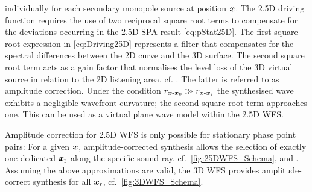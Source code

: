 %
individually for each secondary monopole source at position $\bm{x}$.
%
The 2.5D driving function requires the use of two reciprocal square root terms
to compensate for the deviations occurring in the 2.5D SPA result
\myeq\eqref{eq:pStat25D}.
%
The first square root expression in \myeq\eqref{eq:Driving25D} represents a
filter that compensates for the spectral differences between the 2D curve
and the 3D surface.
The second square root term acts as a gain factor that normalises
the level loss of the 3D virtual source in relation to the 2D listening area,
cf. \cite[Ch.~4.1.3]{Firtha2019_diss}.
%
The latter is referred to as amplitude correction.
%
Under the condition $r_{\bm{x}\text{-}\bm{x}_\mathrm{0}} \gg r_{\bm{x}\text{-}\bm{x}_\mathrm{r}}$ the
synthesised wave exhibits a negligible wavefront curvature; the
second square root term approaches one.
%
This can be used as a virtual plane wave model within the 2.5D WFS.



Amplitude correction for 2.5D WFS is only possible for
stationary phase point pairs:
%
For a given $\bm{x}$, amplitude-corrected synthesis allows the selection
of exactly one dedicated $\bm{x}_\mathrm{r}$ along the specific sound ray,
cf.~\myfig\ref{fig:25DWFS_Schema},
\cite[Ch.~3]{Start1997_diss} and
\cite[Ch.~4]{Firtha2019_diss}.
%
Assuming the above approximations are valid, the 3D WFS provides
amplitude-correct synthesis for all $\bm{x}_\mathrm{r}$, cf.~\myfig\ref{fig:3DWFS_Schema}.



